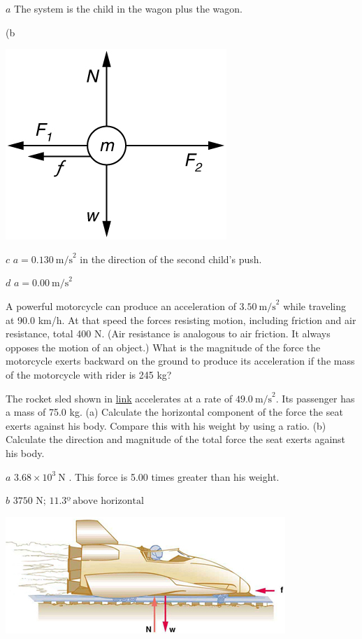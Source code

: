 \documentclass[
]{book}
\newenvironment{problems-exercises}{}{}
\begin{document}
\begin{problems-exercises}
\leavevmode\hypertarget{fs-id900989}{}%
\(a\) The system is the child in the wagon plus the wagon.

(b

\includegraphics{images/Figure_04_03_06.jpg}

\(c\) \({{a = 0}\text{.}\text{130}\ \text{m/s}^{2}}{}\) in the direction
of the second child's push.

\(d\) \({{a = 0.00\ }\text{m/s}^{2}}{}\)

\hypertarget{fs-id2687795}{}
\leavevmode\hypertarget{fs-id2409106}{}%
A powerful motorcycle can produce an acceleration of
\({3.50\ \text{m/s}^{2}}{}\) while traveling at 90.0 km/h. At that speed
the forces resisting motion, including friction and air resistance,
total 400 N. (Air resistance is analogous to air friction. It always
opposes the motion of an object.) What is the magnitude of the force the
motorcycle exerts backward on the ground to produce its acceleration if
the mass of the motorcycle with rider is 245 kg?

\hypertarget{fs-id3091858}{}
\leavevmode\hypertarget{fs-id2991764}{}%
The rocket sled shown in \protect\hyperlink{fs-id1926895}{link}
accelerates at a rate of \({49.0\ \text{m/s}^{2}}{}\). Its passenger has a
mass of 75.0 kg. (a) Calculate the horizontal component of the force the
seat exerts against his body. Compare this with his weight by using a
ratio. (b) Calculate the direction and magnitude of the total force the
seat exerts against his body.

\leavevmode\hypertarget{fs-id1864425}{}%
\(a\) \(3.68 \times 10^{3}\ \text{N}\) . This force is 5.00 times greater
than his weight.

\(b\) \({\text{3750\ N;\ 11.3º}\ \text{above\ horizontal}}{}\)

\includegraphics{images/Figure_04_03_07.jpg}


\end{problems-exercises}
\end{document}
